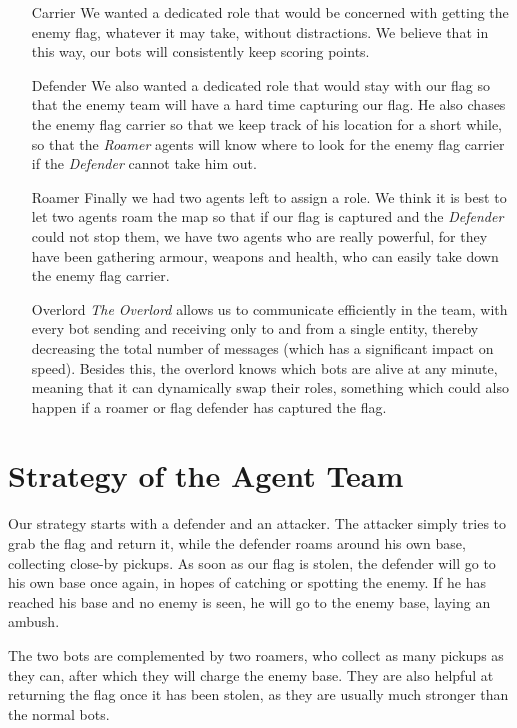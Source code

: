 \begin{enumerate}
\item[Carrier] We wanted a dedicated role that would be concerned with getting the enemy flag, whatever it may take, without distractions. We believe that in this way, our bots will consistently keep scoring points.

\item[Defender] We also wanted a dedicated role that would stay with our flag so that the enemy team will have a hard time capturing our flag. He also chases the enemy flag carrier so that we keep track of his location for a short while, so that the \emph{Roamer} agents will know where to look for the enemy flag carrier if the \emph{Defender} cannot take him out.

\item[Roamer] Finally we had two agents left to assign a role. We think it is best to let two agents roam the map so that if our flag is captured and the \emph{Defender} could not stop them, we have two agents who are really powerful, for they have been gathering armour, weapons and health, who can easily take down the enemy flag carrier.

\item[Overlord] \emph{The Overlord} allows us to communicate efficiently in the team, with every bot sending and receiving only to and from a single entity, thereby decreasing the total number of messages (which has a significant impact on speed). Besides this, the overlord knows which bots are alive at any minute, meaning that it can dynamically swap their roles, something which could also happen if a roamer or flag defender has captured the flag.
\end{enumerate} 

\section{Strategy of the Agent Team}
Our strategy starts with a defender and an attacker. The attacker simply tries to grab the flag and return it, while the defender roams around his own base, collecting close-by pickups. As soon as our flag is stolen, the defender will go to his own base once again, in hopes of catching or spotting the enemy. If he has reached his base and no enemy is seen, he will go to the enemy base, laying an ambush.

The two bots are complemented by two roamers, who collect as many pickups as they can, after which they will charge the enemy base. They are also helpful at returning the flag once it has been stolen, as they are usually much stronger than the normal bots.


